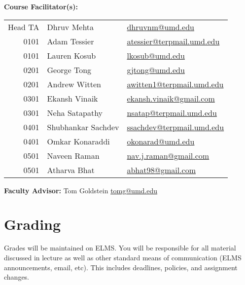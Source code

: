 \documentclass[12pt]{article}
\begin{document}


\medskip

\noindent\textbf{Course Facilitator(s): }

\begin{table}[H]
  \begin{tabular}{@{}rll}
    Head TA & Dhruv Mehta     & \href{mailto:dhruvnm@umd.edu}{dhruvnm@umd.edu}\\
    0101    & Adam Tessier    & \href{mailto:atessier@terpmail.umd.edu}{atessier@terpmail.umd.edu}\\
    0101    & Lauren Kosub    & \href{mailto:lkosub@umd.edu}{lkosub@umd.edu}\\
    0201    & George Tong     & \href{mailto:gjtong@umd.edu}{gjtong@umd.edu}\\
    0201    & Andrew Witten   & \href{mailto:awitten1@terpmail.umd.edu}{awitten1@terpmail.umd.edu}\\
    0301    & Ekansh Vinaik   & \href{mailto:ekansh.vinaik@gmail.com}{ekansh.vinaik@gmail.com}\\
    0301    & Neha Satapathy  & \href{mailto:nsatap@terpmail.umd.edu}{nsatap@terpmail.umd.edu}\\
    0401    & Shubhankar Sachdev & \href{mailto:ssachdev@terpmail.umd.edu}{ssachdev@terpmail.umd.edu}\\
    0401    & Omkar Konaraddi & \href{mailto:okonarad@umd.edu}{okonarad@umd.edu}\\
    0501    & Naveen Raman    & \href{mailto:nav.j.raman@gmail.com}{nav.j.raman@gmail.com}\\
    0501    & Atharva Bhat    & \href{mailto:abhat98@gmail.com}{abhat98@gmail.com}\\ 
  \end{tabular}
\end{table}
\medskip

\noindent\textbf{Faculty Advisor: }Tom Goldstein
\href{mailto:tomg@umd.edu}{tomg@umd.edu} \medskip

\bigskip
\section*{Grading}
\noindent Grades will be maintained on ELMS.
You will be responsible for all material discussed in lecture as well as other standard means of communication (ELMS announcements, email, etc).
This includes deadlines, policies, and assignment changes.
\end{document}
